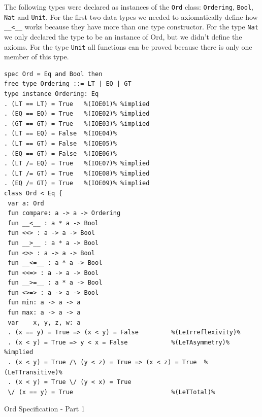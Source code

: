 \documentclass[12pt,twoside]{article}
\numberwithin{spec}{subsection}
\numberwithin{proof}{subsection}
\numberwithin{figure}{subsection}
\numberwithin{code}{subsection}
\begin{document}
The following types were declared as instances of the \verb.Ord. class: \verb.Ordering., \verb.Bool., \verb.Nat. and \verb.Unit.. For the first two data types we needed to axiomatically define how \verb.__<__. works because they have more than one type constructor. For the type \verb.Nat. we only declared the type to be an instance of Ord, but we didn't define the axioms. For the type \verb.Unit. all functions can be proved because there is only one member of this type.

\begin{spec}\capstart
\begin{verbatim}
spec Ord = Eq and Bool then
free type Ordering ::= LT | EQ | GT
type instance Ordering: Eq
. (LT == LT) = True   %(IOE01)% %implied
. (EQ == EQ) = True   %(IOE02)% %implied
. (GT == GT) = True   %(IOE03)% %implied
. (LT == EQ) = False  %(IOE04)%
. (LT == GT) = False  %(IOE05)%
. (EQ == GT) = False  %(IOE06)%
. (LT /= EQ) = True   %(IOE07)% %implied
. (LT /= GT) = True   %(IOE08)% %implied
. (EQ /= GT) = True   %(IOE09)% %implied
class Ord < Eq {
 var a: Ord
 fun compare: a -> a -> Ordering
 fun __<__ : a * a -> Bool
 fun <<> : a -> a -> Bool
 fun __>__ : a * a -> Bool
 fun <>> : a -> a -> Bool
 fun __<=__ : a * a -> Bool
 fun <<=> : a -> a -> Bool
 fun __>=__ : a * a -> Bool
 fun <>=> : a -> a -> Bool
 fun min: a -> a -> a
 fun max: a -> a -> a
 var    x, y, z, w: a
 . (x == y) = True => (x < y) = False         %(LeIrreflexivity)%
 . (x < y) = True => y < x = False            %(LeTAsymmetry)% %implied
 . (x < y) = True /\ (y < z) = True => (x < z) = True  %(LeTTransitive)%
 . (x < y) = True \/ (y < x) = True 
 \/ (x == y) = True                           %(LeTTotal)%
\end{verbatim}
\caption{Ord Specification - Part 1}
\label{spec:Ord}
\end{spec}
\end{document}
